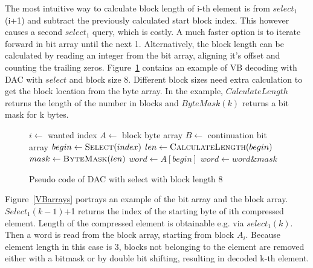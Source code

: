 The most intuitive way to calculate block length of i-th element is from $select_1$(i+1) and subtract the previously calculated start block index. This however causes a second 
$select_1$ query, which is costly. A much faster option is to iterate forward in bit array until the next 1. Alternatively, the block length can be calculated by reading an integer 
from the bit array, aligning it's offset and counting the trailing zeros. Figure~\ref{select_pseudo} contains an example of VB decoding with DAC with $select$ and block size 8. 
Different block sizes need extra calculation to get the block location from the byte array. In the example, $CalculateLength$ returns the length of the number in blocks and $ByteMask(k)$ returns 
a bit mask for k bytes. 

\begin{figure}[ht]
\centering
\begin{algorithmic}
\State $i \gets $ wanted index
\State $A \gets $ block byte array
\State $B \gets $ continuation bit array
\State $begin \gets \Call{Select}{index}$
\State $len \gets \Call{CalculateLength}{begin}$
\State $mask \gets \Call{ByteMask}{len}$
\State $word \gets A[begin]$ 
\State $word \gets word \mathbin{\&} mask$ 


\end{algorithmic}
\caption{Pseudo code of DAC with select with block length 8} \label{select_pseudo}
\end{figure}

Figure~\ref{VBarrays} portrays an example of the bit array and the block array. $Select_1(k-1)$+1 returns the index of the starting byte of ith compressed element. Length of the compressed 
element is obtainable e.g. via $select_1(k)$. Then a word is read from the block array, starting from block $A_i$. Because element length in this case is 3, blocks not belonging to the element
are removed either with a bitmask or by double bit shifting, resulting in decoded k-th element.

